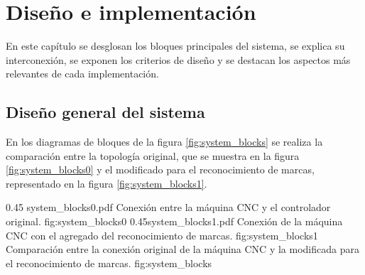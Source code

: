 \chapter{Diseño e implementación} %

\label{Chapter3}

En este capítulo se desglosan los bloques principales del sistema, se explica su interconexión, se exponen los criterios de diseño y se destacan los aspectos más relevantes de cada implementación.

\section{Diseño general del sistema}

En los diagramas de bloques de la figura \ref{fig:system_blocks} se realiza la comparación entre la topología original, que se muestra en la figura \ref{fig:system_blocks0} y el modificado para el reconocimiento de marcas, representado en la figura \ref{fig:system_blocks1}.

\subfigab 
{0.45} {system_blocks0.pdf} {Conexión entre la máquina CNC y el controlador original.} {fig:system_blocks0}
        {0.45}{system_blocks1.pdf} {Conexión de la máquina CNC con el agregado del reconocimiento de marcas.} {fig:system_blocks1}
        {Comparación entre la conexión original de la máquina CNC y la modificada para el reconocimiento de marcas.}
        {fig:system_blocks}

